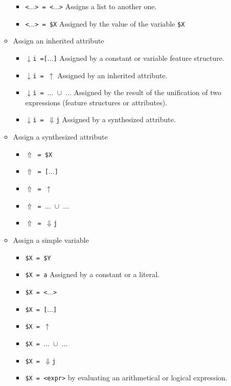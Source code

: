 \documentclass[11pt]{article}
\begin{document}
\begin{itemize}
\begin{itemize}
      \begin{itemize}
      \item  \verb#<#$\dots$\verb#> = <#$\dots$\verb#># Assigns a list to
        another one.
      \item \verb#<#$\dots$\verb#> = $X# Assigned by the value of the
        variable \verb#$X#
      \end{itemize}
      
    \item Assign an inherited attribute
    
      \begin{itemize}
      \item $\downarrow$\verb#i =[#$\dots$\verb#]# Assigned by a
        constant or variable feature structure.
      \item $\downarrow$\verb#i = #$\uparrow$ Assigned by an inherited attribute.
      \item $\downarrow$\verb#i = #$\dots$\verb# #$\cup$\verb# #$\dots$
        Assigned by the result of the unification of two expressions
        (feature structures or attributes).
      \item $\downarrow$\verb#i = #$\Downarrow$\verb#j# Assigned by a
        synthesized attribute.
      \end{itemize}
      
    \item Assign a synthesized attribute
    
      \begin{itemize}
      \item $\Uparrow$\verb# = $X#
      \item $\Uparrow$\verb# = [#$\dots$\verb#]#
      \item $\Uparrow$\verb# = #$\uparrow$
      \item $\Uparrow$\verb# = #$\dots$\verb# #$\cup$\verb# #$\dots$
      \item $\Uparrow$\verb# = #$\Downarrow$\verb#j#
      \end{itemize}
      
    \item  Assign a simple variable
    
      \begin{itemize}
      \item \verb#$X = $Y#
      \item \verb#$X = a# Assigned by a constant or a literal.
      \item \verb#$X = <#$\dots$\verb#>#
      \item \verb#$X = [#$\dots$\verb#]#
      \item \verb#$X = #$\uparrow$
      \item \verb#$X = #$\dots$\verb# #$\cup$\verb# #$\dots$
      \item \verb#$X = #$\Downarrow$\verb#j#
      \item \verb#$X = <expr>#  by evaluating an arithmetical or logical expression.
      \end{itemize}
      

\end{itemize}
\end{itemize}
\end{document}
